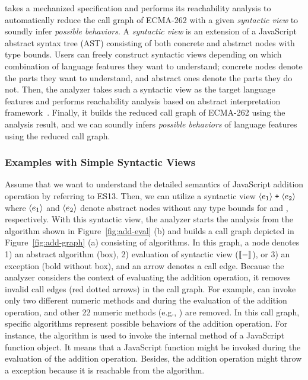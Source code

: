  takes a mechanized specification and performs its
reachability analysis to automatically reduce the call graph of ECMA-262 with a
given \textit{syntactic view} to soundly infer \textit{possible behaviors}.  A
\textit{syntactic view} is an extension of a JavaScript abstract syntax tree
(AST) consisting of both concrete and abstract nodes with type bounds.
Users can freely construct syntactic views depending on which combination of
language features they want to understand; concrete nodes denote the parts they
want to understand, and abstract ones denote the parts they do not.  Then, the
analyzer takes such a syntactic view as the target language features and
performs reachability analysis based on abstract interpretation
framework~\cite{ai1977, ai1992}.  Finally, it builds the reduced call graph of
ECMA-262 using the analysis result, and we can soundly infers \textit{possible
behaviors} of language features using the reduced call graph.


\subsubsection{Examples with Simple Syntactic Views}

Assume that we want to understand the detailed semantics of JavaScript addition
operation by referring to ES13.  Then, we can utilize a syntactic view
$\svhole{\expr_1} \; \code{+} \; \svhole{\expr_2}$ where $\langle e_1 \rangle$ and
$\langle e_2 \rangle$ denote abstract nodes without any type bounds for
 and , respectively.
With this syntactic view, the analyzer starts the analysis from the
 algorithm shown in Figure~\ref{fig:add-eval} (b) and builds a
call graph depicted in Figure~\ref{fig:add-graph} (a) consisting of 
algorithms.  In this graph, a node denotes 1) an abstract algorithm (box), 2)
evaluation of syntactic view ($\llbracket{-}\rrbracket$), or 3) an exception (bold without box),
and an arrow denotes a call edge.  Because the analyzer considers the context of
evaluating the addition operation, it removes invalid call edges (red dotted
arrows) in the call graph.  For example,
 can invoke only two different numeric
methods  and  during the evaluation of the
addition operation, and other 22 numeric methods (e.g., )
are removed.  In this call graph, specific algorithms represent possible
behaviors of the addition operation.  For instance, the  algorithm
is used to invoke the \eswrd{[[Call]]} internal method of a JavaScript function
object.  It means that a JavaScript function might be invoked during the
evaluation of the addition operation.  Besides, the addition operation might
throw a  exception because it is reachable from the
 algorithm.


